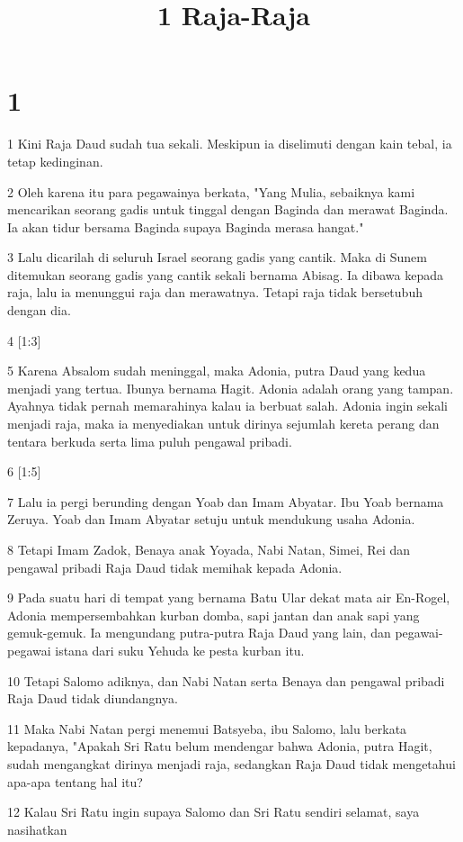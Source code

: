 

\title{1 Raja-Raja}


\chapter{1}

\par 1 Kini Raja Daud sudah tua sekali. Meskipun ia diselimuti dengan kain tebal, ia tetap kedinginan.
\par 2 Oleh karena itu para pegawainya berkata, "Yang Mulia, sebaiknya kami mencarikan seorang gadis untuk tinggal dengan Baginda dan merawat Baginda. Ia akan tidur bersama Baginda supaya Baginda merasa hangat."
\par 3 Lalu dicarilah di seluruh Israel seorang gadis yang cantik. Maka di Sunem ditemukan seorang gadis yang cantik sekali bernama Abisag. Ia dibawa kepada raja, lalu ia menunggui raja dan merawatnya. Tetapi raja tidak bersetubuh dengan dia.
\par 4 [1:3]
\par 5 Karena Absalom sudah meninggal, maka Adonia, putra Daud yang kedua menjadi yang tertua. Ibunya bernama Hagit. Adonia adalah orang yang tampan. Ayahnya tidak pernah memarahinya kalau ia berbuat salah. Adonia ingin sekali menjadi raja, maka ia menyediakan untuk dirinya sejumlah kereta perang dan tentara berkuda serta lima puluh pengawal pribadi.
\par 6 [1:5]
\par 7 Lalu ia pergi berunding dengan Yoab dan Imam Abyatar. Ibu Yoab bernama Zeruya. Yoab dan Imam Abyatar setuju untuk mendukung usaha Adonia.
\par 8 Tetapi Imam Zadok, Benaya anak Yoyada, Nabi Natan, Simei, Rei dan pengawal pribadi Raja Daud tidak memihak kepada Adonia.
\par 9 Pada suatu hari di tempat yang bernama Batu Ular dekat mata air En-Rogel, Adonia mempersembahkan kurban domba, sapi jantan dan anak sapi yang gemuk-gemuk. Ia mengundang putra-putra Raja Daud yang lain, dan pegawai-pegawai istana dari suku Yehuda ke pesta kurban itu.
\par 10 Tetapi Salomo adiknya, dan Nabi Natan serta Benaya dan pengawal pribadi Raja Daud tidak diundangnya.
\par 11 Maka Nabi Natan pergi menemui Batsyeba, ibu Salomo, lalu berkata kepadanya, "Apakah Sri Ratu belum mendengar bahwa Adonia, putra Hagit, sudah mengangkat dirinya menjadi raja, sedangkan Raja Daud tidak mengetahui apa-apa tentang hal itu?
\par 12 Kalau Sri Ratu ingin supaya Salomo dan Sri Ratu sendiri selamat, saya nasihatkan
